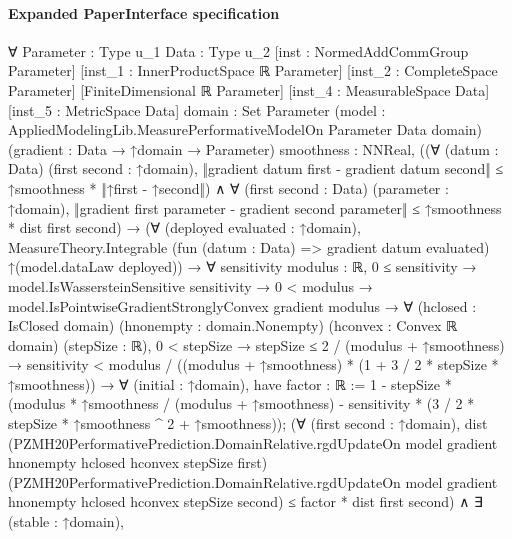 \documentclass[10pt]{article}
\begin{document}
\paragraph{Expanded PaperInterface specification}
\begin{ReviewVerbatim}
∀ {Parameter : Type u_1} {Data : Type u_2} [inst : NormedAddCommGroup Parameter]
  [inst_1 : InnerProductSpace ℝ Parameter] [inst_2 : CompleteSpace Parameter] [FiniteDimensional ℝ Parameter]
  [inst_4 : MeasurableSpace Data] [inst_5 : MetricSpace Data] {domain : Set Parameter}
  (model : AppliedModelingLib.MeasurePerformativeModelOn Parameter Data domain) (gradient : Data → ↑domain → Parameter)
  {smoothness : NNReal},
  ((∀ (datum : Data) (first second : ↑domain),
        ‖gradient datum first - gradient datum second‖ ≤ ↑smoothness * ‖↑first - ↑second‖) ∧
      ∀ (first second : Data) (parameter : ↑domain),
        ‖gradient first parameter - gradient second parameter‖ ≤ ↑smoothness * dist first second) →
    (∀ (deployed evaluated : ↑domain),
        MeasureTheory.Integrable (fun (datum : Data) => gradient datum evaluated) ↑(model.dataLaw deployed)) →
      ∀ {sensitivity modulus : ℝ},
        0 ≤ sensitivity →
          model.IsWassersteinSensitive sensitivity →
            0 < modulus →
              model.IsPointwiseGradientStronglyConvex gradient modulus →
                ∀ (hclosed : IsClosed domain) (hnonempty : domain.Nonempty) (hconvex : Convex ℝ domain) (stepSize : ℝ),
                  0 < stepSize →
                    stepSize ≤ 2 / (modulus + ↑smoothness) →
                      sensitivity < modulus / ((modulus + ↑smoothness) * (1 + 3 / 2 * stepSize * ↑smoothness)) →
                        ∀ (initial : ↑domain),
                          have factor : ℝ :=
                            1 -
                              stepSize *
                                (modulus * ↑smoothness / (modulus + ↑smoothness) -
                                  sensitivity * (3 / 2 * stepSize * ↑smoothness ^ 2 + ↑smoothness));
                          (∀ (first second : ↑domain),
                              dist
                                  (PZMH20PerformativePrediction.DomainRelative.rgdUpdateOn model gradient hnonempty
                                    hclosed hconvex stepSize first)
                                  (PZMH20PerformativePrediction.DomainRelative.rgdUpdateOn model gradient hnonempty
                                    hclosed hconvex stepSize second) ≤
                                factor * dist first second) ∧
                            ∃ (stable : ↑domain),

\end{ReviewVerbatim}
\end{document}
